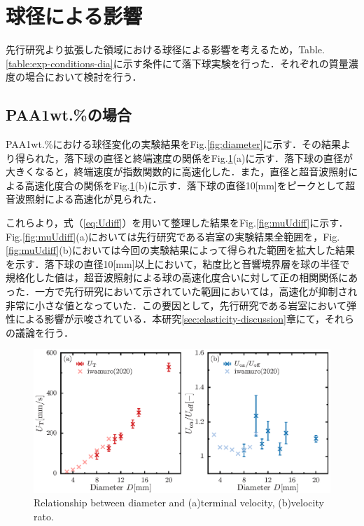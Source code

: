 \section{球径による影響}
先行研究より拡張した領域における球径による影響を考えるため，Table.\ref{table:exp-conditions-dia}に示す条件にて落下球実験を行った．それぞれの質量濃度の場合において検討を行う．

\subsection{PAA1wt.\%の場合}
PAA1wt.\%における球径変化の実験結果をFig.\ref{fig:diameter}に示す．その結果より得られた，落下球の直径と終端速度の関係をFig.\ref{fig:diaUT}(a)に示す．落下球の直径が大きくなると，終端速度が指数関数的に高速化した．また，直径と超音波照射による高速化度合の関係をFig.\ref{fig:diaUT}(b)に示す．落下球の直径10[mm]をピークとして超音波照射による高速化が見られた．

これらより，式（\ref{eq:Udiff}）を用いて整理した結果をFig.\ref{fig:muUdiff}に示す．Fig.\ref{fig:muUdiff}(a)においては先行研究である岩室\cite{ref:8}の実験結果全範囲を，Fig.\ref{fig:muUdiff}(b)においては今回の実験結果によって得られた範囲を拡大した結果を示す．落下球の直径10[mm]以上において，粘度比と音響境界層を球の半径で規格化した値は，超音波照射による球の高速化度合いに対して正の相関関係にあった．一方で先行研究において示されていた範囲においては，高速化が抑制され非常に小さな値となっていた．この要因として，先行研究である岩室\cite{ref:8}において弾性による影響が示唆されている．本研究\ref{sec:elasticity-discussion}章にて，それらの議論を行う．

\begin{figure}[ht]
    \centering
    \includegraphics[width=1\textwidth]{./5-Results/diaUT_Udiff.eps}
    \caption{Relationship between diameter and (a)terminal velocity, (b)velocity rato.}
    \label{fig:diaUT}
\end{figure}

